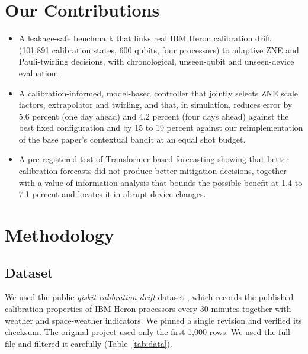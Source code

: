 \documentclass[conference]{IEEEtran}
\begin{document}
\section{Our Contributions}
\begin{itemize}
\item A leakage-safe benchmark that links real IBM Heron calibration drift (101,891 calibration states, 600 qubits, four processors) to adaptive ZNE and Pauli-twirling decisions, with chronological, unseen-qubit and unseen-device evaluation.
\item A calibration-informed, model-based controller that jointly selects ZNE scale factors, extrapolator and twirling, and that, in simulation, reduces error by 5.6 percent (one day ahead) and 4.2 percent (four days ahead) against the best fixed configuration and by 15 to 19 percent against our reimplementation of the base paper's contextual bandit at an equal shot budget.
\item A pre-registered test of Transformer-based forecasting showing that better calibration forecasts did not produce better mitigation decisions, together with a value-of-information analysis that bounds the possible benefit at 1.4 to 7.1 percent and locates it in abrupt device changes.
\end{itemize}

\section{Methodology}
\subsection{Dataset}
We used the public \textit{qiskit-calibration-drift} dataset \cite{driftdata}, which records the published calibration properties of IBM Heron processors every 30 minutes together with weather and space-weather indicators. We pinned a single revision and verified its checksum. The original project used only the first 1,000 rows. We used the full file and filtered it carefully (Table~\ref{tab:data}).
\end{document}
